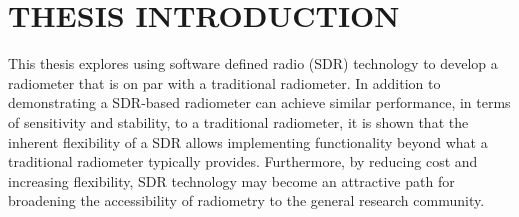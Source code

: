 \chapter{THESIS INTRODUCTION}




This thesis explores using software defined radio (SDR) technology to develop a radiometer that is on par with a traditional radiometer.  In addition to demonstrating a SDR-based radiometer can achieve similar performance, in terms of sensitivity and stability, to a traditional radiometer, it is shown that the inherent flexibility of a SDR allows implementing functionality beyond what a traditional radiometer typically provides.  Furthermore, by reducing cost and increasing flexibility, SDR technology may become an attractive path for broadening the accessibility of radiometry to the general research community.


